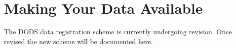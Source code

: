 

\chapter{Making Your Data Available}


The DODS data registration scheme is currently undergoing revision. Once
revised the new scheme will be documented here.




